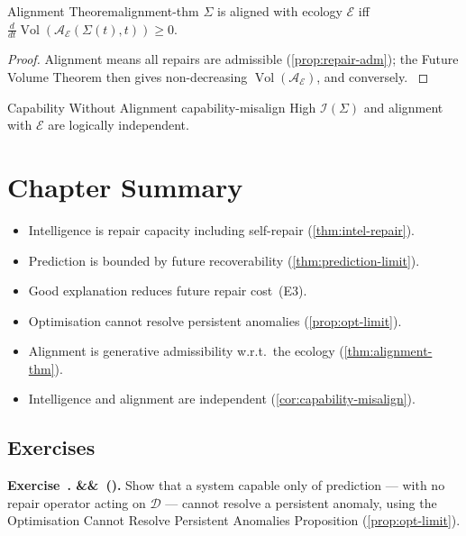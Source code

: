 \documentclass[12pt,twoside,openright]{book}
\newcommand{\adm}{\mathcal{A}}
\newcommand{\Vol}{\operatorname{Vol}}
\newenvironment{chapsummary}{%
  \begin{tcolorbox}[colback=DistBlue!5,colframe=DistBlue,
    title={\faBookOpen\enspace Summary},
    fonttitle=\sffamily\bfseries\color{white},
    attach boxed title to top left={yshift=-2mm,xshift=4mm},
    boxed title style={colback=DistBlue,rounded corners}]
  \begin{itemize}[nosep,leftmargin=*]}{%
  \end{itemize}\end{tcolorbox}}
\newcounter{exercise}[chapter]
\newenvironment{exercise}[1][]{%
  \refstepcounter{exercise}%
  \noindent\textbf{\sffamily\color{DistBlue}%
  Exercise~\thechapter.\theexercise%
  \ifx&#1&\else~(#1)\fi.}\enspace}{\par\medskip}
\begin{document}
\begin{theorem}{Alignment Theorem}{alignment-thm}
  $\Sigma$ is aligned with ecology $\mathcal{E}$ iff
  $\frac{d}{dt}\Vol(\adm_\mathcal{E}(\Sigma(t),t))\ge0$.
\end{theorem}
\begin{proof}
  Alignment means all repairs are admissible
  (\cref{prop:repair-adm}); the Future Volume Theorem
  then gives non-decreasing $\Vol(\adm_\mathcal{E})$,
  and conversely.
  \parencite{amodei2016,russell2019}
\end{proof}

\begin{corollary}{Capability Without Alignment}%
  {capability-misalign}
  High $\mathcal{I}(\Sigma)$ and alignment with
  $\mathcal{E}$ are logically independent.
\end{corollary}

\section*{Chapter Summary}
\begin{chapsummary}
  \item Intelligence is repair capacity including
        self-repair (\cref{thm:intel-repair}).
  \item Prediction is bounded by future recoverability
        (\cref{thm:prediction-limit}).
  \item Good explanation reduces future repair cost~(E3).
  \item Optimisation cannot resolve persistent anomalies
        (\cref{prop:opt-limit}).
  \item Alignment is generative admissibility
        w.r.t.\ the ecology (\cref{thm:alignment-thm}).
  \item Intelligence and alignment are independent
        (\cref{cor:capability-misalign}).
\end{chapsummary}

\subsection*{Exercises}

\begin{exercise}
  Show that a system capable only of prediction --- with no
  repair operator acting on $\mathcal{D}$ --- cannot resolve
  a persistent anomaly, using the Optimisation Cannot
  Resolve Persistent Anomalies Proposition
  (\cref{prop:opt-limit}).
\end{exercise}
\end{document}
